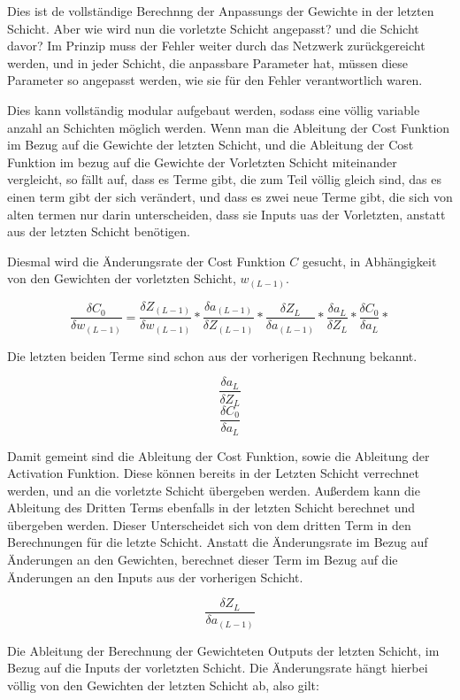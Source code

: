 \documentclass[12pt]{article}
\begin{document}
Dies ist de vollständige Berechnng der Anpassungs der Gewichte in der letzten Schicht. Aber wie wird nun die vorletzte Schicht angepasst? und die Schicht davor?
Im Prinzip muss der Fehler weiter durch das Netzwerk zurückgereicht werden, und in jeder Schicht, die anpassbare Parameter hat, müssen diese Parameter so angepasst werden, wie sie für den Fehler verantwortlich waren.

Dies kann vollständig modular aufgebaut werden, sodass eine völlig variable anzahl an Schichten möglich werden. Wenn man die Ableitung der Cost Funktion im Bezug auf die Gewichte der letzten Schicht, und die Ableitung der Cost Funktion im bezug auf die Gewichte der Vorletzten Schicht miteinander vergleicht, so fällt auf, dass es Terme gibt, die zum Teil völlig gleich sind, das es einen term gibt der sich verändert, und dass es zwei neue Terme gibt, die sich von alten termen nur darin unterscheiden, dass sie Inputs uas der Vorletzten, anstatt aus der letzten Schicht benötigen.

Diesmal wird die Änderungsrate der Cost Funktion $C$ gesucht, in Abhängigkeit von den Gewichten der vorletzten Schicht, $w_{(L-1)}$.

$$\frac{\delta C_0}{\delta w_{(L-1)}}=
\frac{\delta Z_{(L-1)}}{\delta w_{(L-1)}}*
\frac{\delta a_{(L-1)}}{\delta Z_{(L-1)}}*
\frac{\delta Z_L}{\delta a_{(L-1)}}*
\frac{\delta a_L}{\delta Z_L}*
\frac{\delta C_0}{\delta a_L}*
$$

Die letzten beiden Terme sind schon aus der vorherigen Rechnung bekannt.

$$\frac{\delta a_L}{\delta Z_L}$$
$$\frac{\delta C_0}{\delta a_L}$$

Damit gemeint sind die Ableitung der Cost Funktion, sowie die Ableitung der Activation Funktion. Diese können bereits in der Letzten Schicht verrechnet werden, und an die vorletzte Schicht übergeben werden. Außerdem kann die Ableitung des Dritten Terms ebenfalls in der letzten Schicht berechnet und übergeben werden. Dieser Unterscheidet sich von dem dritten Term in den Berechnungen für die letzte Schicht. Anstatt die Änderungsrate im Bezug auf Änderungen an den Gewichten, berechnet dieser Term im Bezug auf die Änderungen an den Inputs aus der vorherigen Schicht.

$$\frac{\delta Z_L}{\delta a_{(L-1)}}$$

Die Ableitung der Berechnung der Gewichteten Outputs der letzten Schicht, im Bezug auf die Inputs der vorletzten Schicht. Die Änderungsrate hängt hierbei völlig von den Gewichten der letzten Schicht ab, also gilt:
\end{document}
